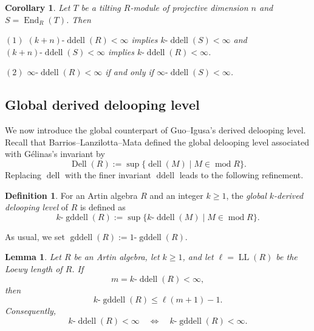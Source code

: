 \documentclass[12pt,a4paper,reqno]{amsart}
\theoremstyle{plain}
\newtheorem{lemma}[theorem]{Lemma}
\newtheorem{corollary}[theorem]{Corollary}
\theoremstyle{definition}
\newtheorem{definition}[theorem]{Definition}
\theoremstyle{remark}
\DeclareMathOperator{\modd}{mod}
\DeclareMathOperator{\End}{End}
\DeclareMathOperator{\dell}{dell}
\DeclareMathOperator{\ddell}{ddell}
\DeclareMathOperator{\Dell}{Dell}
\DeclareMathOperator{\gddell}{gddell}
\begin{document}
\begin{corollary} \label{cor:tilting}
Let $T$ be a tilting $R$-module of projective dimension $n$ and $S = \End_R(T)$. Then 

$(1)$ $(k+n)\text{-}\ddell(R) < \infty$ implies  $k\text{-}\ddell(S) < \infty$ and $(k+n)\text{-}\ddell(S) < \infty$ implies  $k\text{-}\ddell(R) < \infty$.

$(2)$ $\infty\text{-}\ddell(R) < \infty$ if and only if  $\infty\text{-}\ddell(S) < \infty$.

\end{corollary}


\subsection{Global derived delooping level}\label{sec:gddell} 

We now introduce the global counterpart of Guo--Igusa's derived
delooping level. Recall that Barrios--Lanzilotta--Mata \cite{BLM}
defined the global delooping level associated with Gélinas's
invariant by
\[
\Dell(R):=\sup\{\dell(M)\mid M\in\modd R\}.
\]
Replacing $\dell$ with the finer invariant $\ddell$ leads to the
following refinement.

\begin{definition}\label{def:gddell}
For an Artin algebra $R$ and an integer $k\ge 1$, the \emph{global $k$-derived delooping level} of $R$ is defined as
\[
k\text{-}\gddell(R) := \sup\{ k\text{-}\ddell(M) \mid M\in \modd R\}.
\]
\end{definition}

As usual, we set \(\gddell(R) := 1\text{-}\gddell(R)\).

\begin{lemma}\label{lem:global-ddell}
Let \(R\) be an Artin algebra, let \(k\geq 1\), and let
\(\ell=\operatorname{LL}(R)\) be the Loewy length of \(R\). If
\[
m=k\text{-}\ddell(R)<\infty,
\]
then
\[
k\text{-}\gddell(R)
\leq \ell(m+1)-1.
\]
Consequently,
\[
k\text{-}\ddell(R)<\infty
\quad\Longleftrightarrow\quad
k\text{-}\gddell(R)<\infty.
\]
\end{lemma}
\end{document}
